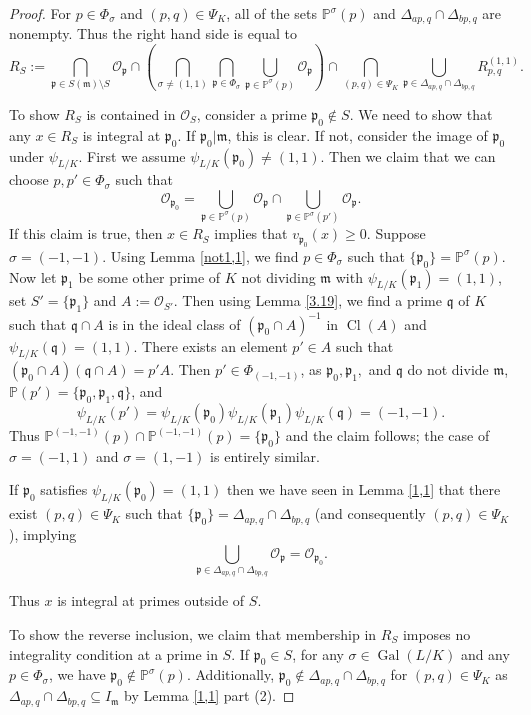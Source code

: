 \documentclass[12pt,reqno]{amsart}
\newcommand{\qq}{\mathfrak{q}}
\newcommand{\mm}{\mathfrak{m}}
\newcommand{\OO}{\mathcal{O}}
\newcommand{\pp}{\mathfrak{p}}
\newcommand{\PP}{\mathbb{P}}
\DeclareMathOperator{\Gal}{Gal}
\DeclareMathOperator{\Cl}{Cl}
\theoremstyle{definition}
\begin{document}
\begin{proof}
For $p\in \Phi_{\sigma}$ and $(p,q)\in \Psi_{K}$, all of the sets $\PP^{\sigma}(p)$ and $\Delta_{ap,q}\cap\Delta_{bp,q}$ are nonempty. Thus the right hand side is equal to 
\[
R_S:=\bigcap_{\pp\in S(\mm)\setminus S}\OO_{\pp} \cap \left(\bigcap_{\sigma\not=(1,1)}\bigcap_{\pp\in \Phi_{\sigma}}\bigcup_{\pp\in \PP^{\sigma}(p)} \OO_{\pp}\right) \cap \bigcap_{(p,q)\in \Psi_{K}}\bigcup_{\pp\in \Delta_{ap,q}\cap\Delta_{bp,q}} R_{p,q}^{(1,1)}.
\]

To show $R_S$ is contained in $\OO_S$, consider a prime $\pp_0\not \in S$. We need to show that any $x\in R_S$ is integral at $\pp_0$. If $\pp_0|\mm$, this is clear. If not, consider the image of $\pp_0$ under $\psi_{L/K}$.  First we assume $\psi_{L/K}(\pp_0)\not= (1,1)$. Then we claim that we can choose $p,p'\in \Phi_{\sigma}$ such that 
\[
\OO_{\pp_0} = \bigcup_{\pp\in \PP^{\sigma}(p)} \OO_{\pp} \cap \bigcup_{\pp\in \PP^{\sigma}(p')} \OO_{\pp}.
\]
If this claim is true, then $x\in R_S$ implies that $v_{\pp_0}(x)\geq 0$. Suppose $\sigma=(-1,-1)$. Using Lemma \ref{not1,1}, we find $p\in \Phi_{\sigma}$ such that $\{\pp_0\}=\PP^{\sigma}(p)$. Now let $\pp_1$ be some other prime of $K$ not dividing $\mm$ with $\psi_{L/K}(\pp_1)=(1,1)$, set $S'=\{\pp_1\}$ and $A:=\OO_{S'}$. Then using Lemma \ref{3.19}, we find a prime $\qq$ of $K$ such that $\qq\cap A$ is in the ideal class of $(\pp_0\cap A)^{-1}$ in $\Cl(A)$ and $\psi_{L/K}(\qq)=(1,1)$. There  exists an element $p'\in A$ such that $(\pp_0\cap A)(\qq\cap A)=p'A$. Then $p'\in \Phi_{(-1,-1)}$, as $\pp_0,\pp_1,$ and $\qq$ do not divide $\mm$, $\PP(p')=\{\pp_0,\pp_1,\qq\}$, and
\[
\psi_{L/K}(p')=\psi_{L/K}(\pp_0)\psi_{L/K}(\pp_1)\psi_{L/K}(\qq)=(-1,-1).
\]
Thus $\PP^{(-1,-1)}(p)\cap\PP^{(-1,-1)}(p)=\{\pp_0\}$ and the claim follows; the case of $\sigma=(-1,1)$ and $\sigma=(1,-1)$ is entirely similar. 

If $\pp_0$ satisfies $\psi_{L/K}(\pp_0)=(1,1)$ then we have seen in Lemma \ref{1,1} that there exist $(p,q)\in \Psi_K$ such that $\{\pp_0\}=\Delta_{ap,q}\cap \Delta_{bp,q}$ (and consequently $(p,q)\in \Psi_{K}$), implying
\[
\bigcup_{\pp\in \Delta_{ap,q}\cap \Delta_{bp,q}} \OO_{\pp} = \OO_{\pp_0}.
\]

Thus $x$ is integral at primes outside of $S$. 

To show the reverse inclusion, we claim that membership in $R_S$ imposes no integrality condition at a prime in $S$.  If $\pp_0\in S$, for any $\sigma\in \Gal(L/K)$ and any $p\in \Phi_{\sigma}$, we have $\pp_0\not\in \PP^{\sigma}(p)$. Additionally, $\pp_0\not\in \Delta_{ap,q}\cap\Delta_{bp,q}$ for $(p,q)\in \Psi_K$ as $\Delta_{ap,q}\cap\Delta_{bp,q}\subseteq I_{\mm}$ by Lemma \ref{1,1} part (2). 
\end{proof}
\end{document}
